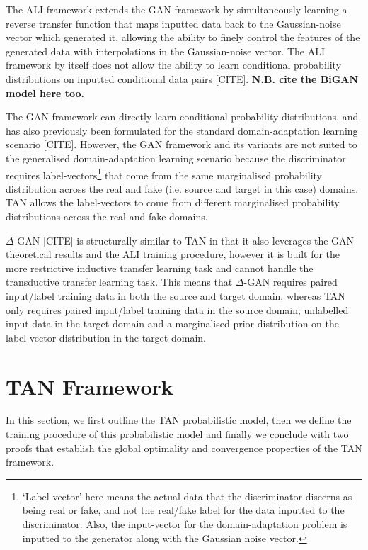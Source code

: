 \documentclass{article}
\begin{document}
The ALI framework extends the GAN framework by simultaneously learning a reverse transfer function that maps inputted data back to the Gaussian-noise vector which generated it, allowing the ability to finely control the features of the generated data with interpolations in the Gaussian-noise vector. The ALI framework by itself does not allow the ability to learn conditional probability distributions on inputted conditional data pairs [CITE]. \textbf{N.B. cite the BiGAN model here too. }

The GAN framework can directly learn conditional probability distributions, and has also previously been formulated for the standard domain-adaptation learning scenario [CITE]. However, the GAN framework and its variants are not suited to the generalised domain-adaptation learning scenario because the discriminator requires label-vectors\footnote{`Label-vector' here means the actual data that the discriminator discerns as being real or fake, and not the real/fake label for the data inputted to the discriminator. Also, the input-vector for the domain-adaptation problem is inputted to the generator along with the Gaussian noise vector.} that come from the same marginalised probability distribution across the real and fake (i.e. source and target in this case) domains. TAN allows the label-vectors to come from different marginalised probability distributions across the real and fake domains.

$\Delta$-GAN [CITE] is structurally similar to TAN in that it also leverages the GAN theoretical results and the ALI training procedure, however it is built for the more restrictive inductive transfer learning task and cannot handle the transductive transfer learning task. This means that $\Delta$-GAN requires paired input/label training data in both the source and target domain, whereas TAN only requires paired input/label training data in the source domain, unlabelled input data in the target domain and a marginalised prior distribution on the label-vector distribution in the target domain.

\section{TAN Framework}
In this section, we first outline the TAN probabilistic model, then we define the training procedure of this probabilistic model and finally we conclude with two proofs that establish the global optimality and convergence properties of the TAN framework. 
\end{document}
